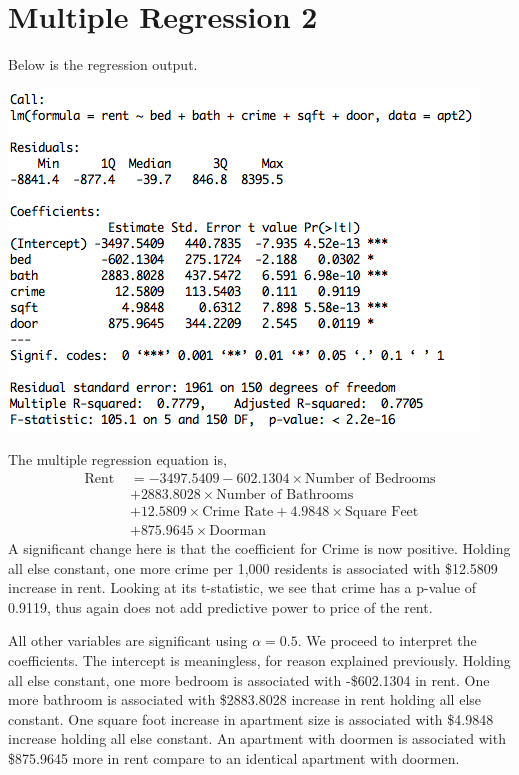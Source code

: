 \documentclass[a4 paper, 11 pt, twocolumn]{article}
\begin{document}
\section{Multiple Regression 2}
Below is the regression output.
\begin{center}
\includegraphics[scale=0.55]{mr2}
\end{center}
The multiple regression equation is,
\begin{align*}
\text{Rent } &= -3497.5409 -602.1304 \times \text{Number of Bedrooms} \\
&+ 2883.8028 \times \text{Number of Bathrooms} \\
&+12.5809 \times \text{Crime Rate} + 4.9848 \times \text{Square Feet} \\
& +875.9645 \times \text{Doorman}
\end{align*}
A significant change here is that the coefficient for Crime is now positive. Holding all else constant, one more crime per 1,000 residents is associated with \$12.5809 increase in rent. Looking at its t-statistic, we see that crime has a p-value of 0.9119, thus again does not add predictive power to price of the rent.

All other variables are significant using $\alpha =0.5$. We proceed to interpret the coefficients. The intercept is meaningless, for reason explained previously. Holding all else constant, one more bedroom is associated with -\$602.1304 in rent. One more bathroom is associated with \$2883.8028 increase in rent holding all else constant. One square foot increase in apartment size is associated with \$4.9848 increase holding all else constant. An apartment with doormen is associated with \$875.9645 more in rent compare to an identical apartment with doormen.
\end{document}
